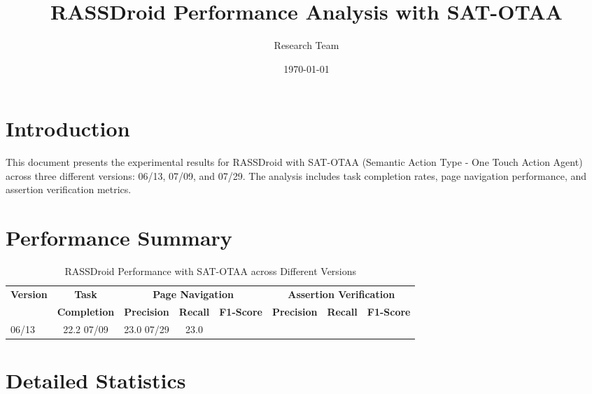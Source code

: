 \documentclass{article}
\title{RASSDroid Performance Analysis with SAT-OTAA}
\author{Research Team}
\date{\today}
\begin{document}
\maketitle

\section{Introduction}

This document presents the experimental results for RASSDroid with SAT-OTAA (Semantic Action Type - One Touch Action Agent) across three different versions: 06/13, 07/09, and 07/29. The analysis includes task completion rates, page navigation performance, and assertion verification metrics.

\section{Performance Summary}


\begin{table}[htbp]
\centering
\caption{RASSDroid Performance with SAT-OTAA across Different Versions}
\label{tab:rassdroid_sat_otaa_results}
\begin{tabular}{lccccccc}
\toprule
\textbf{Version} & \textbf{Task} & \multicolumn{3}{c}{\textbf{Page Navigation}} & \multicolumn{3}{c}{\textbf{Assertion Verification}} \\
\cmidrule(lr){3-5} \cmidrule(lr){6-8}
& \textbf{Completion} & \textbf{Precision} & \textbf{Recall} & \textbf{F1-Score} & \textbf{Precision} & \textbf{Recall} & \textbf{F1-Score} \\
\midrule
06/13 & 22.2%
07/09 & 23.0%
07/29 & 23.0%
\bottomrule
\end{tabular}
\end{table}

\section{Detailed Statistics}
\end{document}
